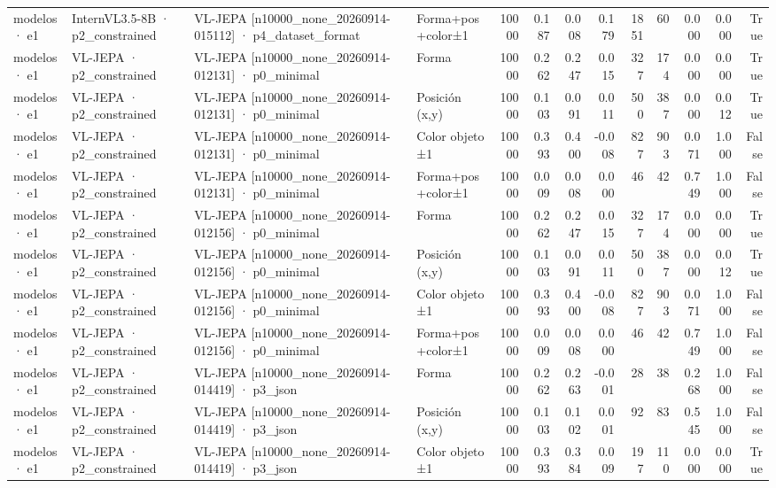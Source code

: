 \begin{tabular}{llllrrrrrrrrr}
modelos · e1 & InternVL3.5-8B · p2\_constrained & VL-JEPA [n10000\_none\_20260914-015112] · p4\_dataset\_format & Forma+pos+color±1 & 10000 & 0.187 & 0.008 & 0.179 & 1851 & 60 & 0.000 & 0.000 & True \\
modelos · e1 & VL-JEPA · p2\_constrained & VL-JEPA [n10000\_none\_20260914-012131] · p0\_minimal & Forma & 10000 & 0.262 & 0.247 & 0.015 & 327 & 174 & 0.000 & 0.000 & True \\
modelos · e1 & VL-JEPA · p2\_constrained & VL-JEPA [n10000\_none\_20260914-012131] · p0\_minimal & Posición (x,y) & 10000 & 0.103 & 0.091 & 0.011 & 500 & 387 & 0.000 & 0.012 & True \\
modelos · e1 & VL-JEPA · p2\_constrained & VL-JEPA [n10000\_none\_20260914-012131] · p0\_minimal & Color objeto ±1 & 10000 & 0.393 & 0.400 & -0.008 & 827 & 903 & 0.071 & 1.000 & False \\
modelos · e1 & VL-JEPA · p2\_constrained & VL-JEPA [n10000\_none\_20260914-012131] · p0\_minimal & Forma+pos+color±1 & 10000 & 0.009 & 0.008 & 0.000 & 46 & 42 & 0.749 & 1.000 & False \\
modelos · e1 & VL-JEPA · p2\_constrained & VL-JEPA [n10000\_none\_20260914-012156] · p0\_minimal & Forma & 10000 & 0.262 & 0.247 & 0.015 & 327 & 174 & 0.000 & 0.000 & True \\
modelos · e1 & VL-JEPA · p2\_constrained & VL-JEPA [n10000\_none\_20260914-012156] · p0\_minimal & Posición (x,y) & 10000 & 0.103 & 0.091 & 0.011 & 500 & 387 & 0.000 & 0.012 & True \\
modelos · e1 & VL-JEPA · p2\_constrained & VL-JEPA [n10000\_none\_20260914-012156] · p0\_minimal & Color objeto ±1 & 10000 & 0.393 & 0.400 & -0.008 & 827 & 903 & 0.071 & 1.000 & False \\
modelos · e1 & VL-JEPA · p2\_constrained & VL-JEPA [n10000\_none\_20260914-012156] · p0\_minimal & Forma+pos+color±1 & 10000 & 0.009 & 0.008 & 0.000 & 46 & 42 & 0.749 & 1.000 & False \\
modelos · e1 & VL-JEPA · p2\_constrained & VL-JEPA [n10000\_none\_20260914-014419] · p3\_json & Forma & 10000 & 0.262 & 0.263 & -0.001 & 28 & 38 & 0.268 & 1.000 & False \\
modelos · e1 & VL-JEPA · p2\_constrained & VL-JEPA [n10000\_none\_20260914-014419] · p3\_json & Posición (x,y) & 10000 & 0.103 & 0.102 & 0.001 & 92 & 83 & 0.545 & 1.000 & False \\
modelos · e1 & VL-JEPA · p2\_constrained & VL-JEPA [n10000\_none\_20260914-014419] · p3\_json & Color objeto ±1 & 10000 & 0.393 & 0.384 & 0.009 & 197 & 110 & 0.000 & 0.000 & True \\

\end{tabular}
